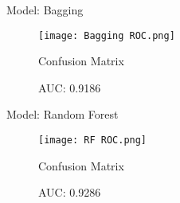 \documentclass[notes,compress,serif,professionalfont]{beamer}
\begin{document}
\begin{frame}{Model: Bagging}
    \begin{figure}
        \centering
        \begin{minipage}{.5\textwidth}
            \centering
            \texttt{[image: Bagging ROC.png]}
        \end{minipage}%
        \begin{minipage}{.5\textwidth}
            \caption*{Confusion Matrix}
            \begin{table}
            \centering
            \end{table}
        \end{minipage}
    \caption{AUC: 0.9186}
    \end{figure}
\end{frame}

\begin{frame}{Model: Random Forest}
    \begin{figure}
        \centering
        \begin{minipage}{.5\textwidth}
            \centering
            \texttt{[image: RF ROC.png]}
        \end{minipage}%
        \begin{minipage}{.5\textwidth}
            \caption*{Confusion Matrix}
            \begin{table}
            \centering
            \end{table}
        \end{minipage}
    \caption{AUC: 0.9286}
    \end{figure}    
\end{frame}
\end{document}
